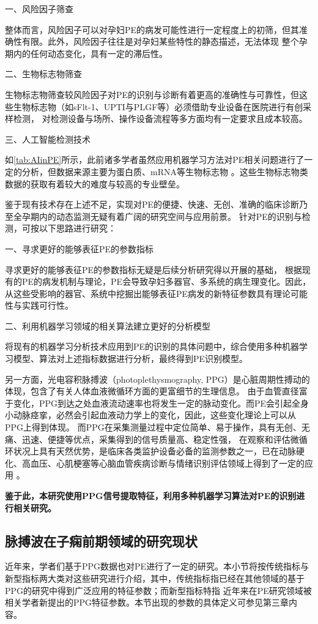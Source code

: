 一、风险因子筛查

整体而言，风险因子可以对孕妇PE的病发可能性进行一定程度上的初筛，但其准确性有限。此外，风险因子往往是对孕妇某些特性的静态描述，无法体现
整个孕期内的任何动态变化，具有一定的滞后性。

二、生物标志物筛查

生物标志物筛查较风险因子对PE的识别与诊断有着更高的准确性与可靠性，但这些生物标志物（如sFlt-1、UPTI与PLGF等）必须借助专业设备在医院进行有创采样检测，
对检测设备与场所、操作设备流程等多方面均有一定要求且成本较高。

三、人工智能检测技术

如\autoref{tab:AIinPE}所示，此前诸多学者虽然应用机器学习方法对PE相关问题进行了一定的分析，但数据来源主要为蛋白质、mRNA等生物标志物
。这些生物标志物类数据的获取有着较大的难度与较高的专业壁垒。

鉴于现有技术存在上述不足，实现对PE的便捷、快速、无创、准确的临床诊断乃至全孕期内的动态监测无疑有着广阔的研究空间与应用前景。
针对PE的识别与检测，可按以下思路进行研究：

一、寻求更好的能够表征PE的参数指标

寻求更好的能够表征PE的参数指标无疑是后续分析研究得以开展的基础，
根据现有的PE的病发机制与理论，PE会导致孕妇多器官、多系统的病生理变化。因此，从这些受影响的器官、系统中挖掘出能够表征PE病发的新特征参数具有理论可能性与实践可行性。

二、利用机器学习领域的相关算法建立更好的分析模型

将现有的机器学习分析技术应用到PE的识别的具体问题中，综合使用多种机器学习模型、算法对上述指标数据进行分析，最终得到PE识别模型。

另一方面，光电容积脉搏波（photoplethysmography, PPG）是心脏周期性搏动的体现，包含了有关人体血液微循环方面的更富细节的生理信息\cite{PPGYY}。
由于血管直径富于变化，PPG到达之处血液流动速率也将发生一定的脉动变化。而PE会引起全身小动脉痉挛，必然会引起血液动力学上的变化，因此，这些变化理论上可以从PPG上得到体现。
而PPG在采集测量过程中定位简单、易于操作，具有无创、无痛、迅速、便捷等优点，采集得到的信号质量高、稳定性强，
在观察和评估微循环状况上具有天然优势，是临床各类监护设备必备的监测参数之一，已在动脉硬化、高血压、心肌梗塞等心脑血管疾病诊断与情绪识别评估领域上得到了一定的应用
\cite{PPGYY,Allen2007,THOCBPM,Zhang2010,Hamilton1997,Chen2020}。

\textbf{鉴于此，本研究使用PPG信号提取特征，利用多种机器学习算法对PE的识别进行相关研究。}

\subsection{脉搏波在子痫前期领域的研究现状}
近年来，学者们基于PPG数据也对PE进行了一定的研究。本小节将按传统指标与新型指标两大类对这些研究进行介绍，其中，传统指标指已经在其他领域的基于PPG的研究中得到广泛应用的特征参数；而新型指标特指
近年来在PE研究领域被相关学者新提出的PPG特征参数。本节出现的参数的具体定义可参见第三章内容。

